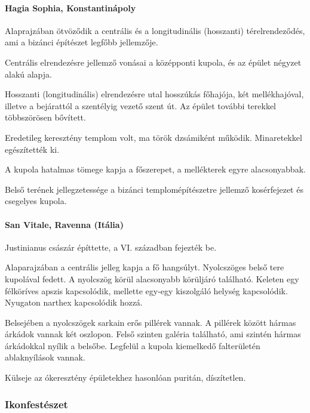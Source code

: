 	\paragraph{Hagia Sophia, Konstantinápoly}
	Alaprajzában ötvöződik a centrális és a longitudinális (hosszanti) térelrendeződés, ami a bizánci építészet legfőbb jellemzője.
	
	Centrális elrendezésre jellemző vonásai a középponti kupola, és az épület négyzet alakú alapja.
	
	Hosszanti (longitudinális) elrendezésre utal hosszúkás főhajója, két mellékhajóval, illetve a bejárattól a szentélyig vezető szent út. Az épület további terekkel többszörösen bővített.
	
	Eredetileg keresztény templom volt, ma török dzsámiként működik. Minaretekkel egészítették ki.
	
	A kupola hatalmas tömege kapja a főszerepet, a mellékterek egyre alacsonyabbak.
	
	Belső terének jellegzetessége a bizánci templomépítészetre jellemző kosérfejezet és csegelyes kupola.

\vspace{0.5cm}


\paragraph{San Vitale, Ravenna (Itália)}
Justinianus császár építtette, a VI. században fejezték be.

Alaparajzában a centrális jelleg kapja a fő hangsúlyt. Nyolcszöges belső tere kupolával fedett. A nyolcszög körül alacsonyabb körüljáró található. Keleten egy félköríves apszis kapcsolódik, mellette egy-egy kiszolgáló helység kapcsolódik. Nyugaton narthex kapcsolódik hozzá.

Belsejében a nyolcszögek sarkain erős pillérek vannak. A pillérek között hármas árkádok
vannak két oszlopon. Felső szinten galéria található, ami szintén hármas
árkádokkal nyílik a belsőbe. Legfelül a kupola kiemelkedő falterületén
ablaknyílások vannak.

Külseje az ókeresztény épületekhez hasonlóan puritán, díszítetlen.
	
\subsubsection{Ikonfestészet}

